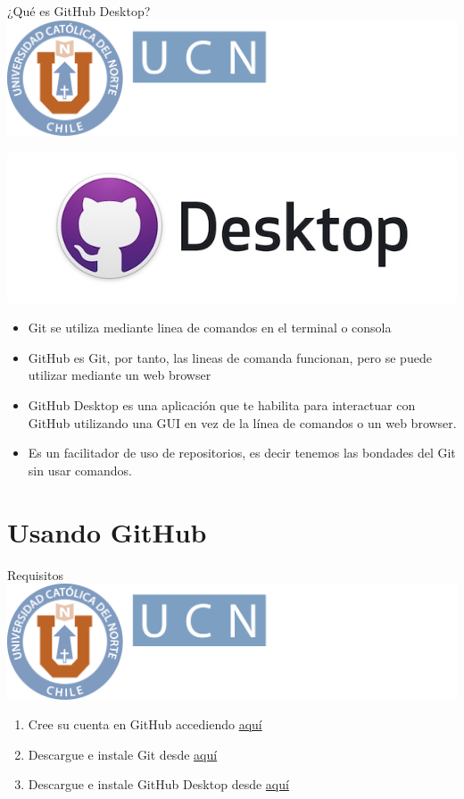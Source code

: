 \documentclass[12pt,a4paper,usenames,x11names,compress]{beamer}
\begin{document}
\begin{frame}{¿Qué es GitHub Desktop? \hfill \includegraphics[scale=.1]{eciem.png}}
\begin{center}
\includegraphics[scale=.21]{desktop.png} 
\end{center}%
\begin{itemize}
\justifying
\item Git se utiliza mediante linea de comandos en el terminal o consola
\item GitHub es Git, por tanto, las lineas de comanda funcionan,  pero se puede utilizar mediante un web browser
\item GitHub Desktop es una aplicación que te habilita para interactuar con GitHub utilizando una GUI en vez de la línea de comandos o un web browser. 
\item Es un facilitador de uso de repositorios, es decir tenemos las bondades del Git sin usar comandos.
\end{itemize}
\end{frame}

\section{Usando GitHub}
\begin{frame}{Requisitos \hfill \includegraphics[scale=.1]{eciem.png}}
\begin{enumerate}
\item Cree su cuenta en GitHub accediendo \href{https://github.com/login}{aquí}
\item Descargue e instale Git desde \href{https://git-scm.com/downloads}{aquí}
\item Descargue e instale GitHub Desktop desde \href{https://desktop.github.com/}{aquí}
\end{enumerate}
\end{frame}
\end{document}
